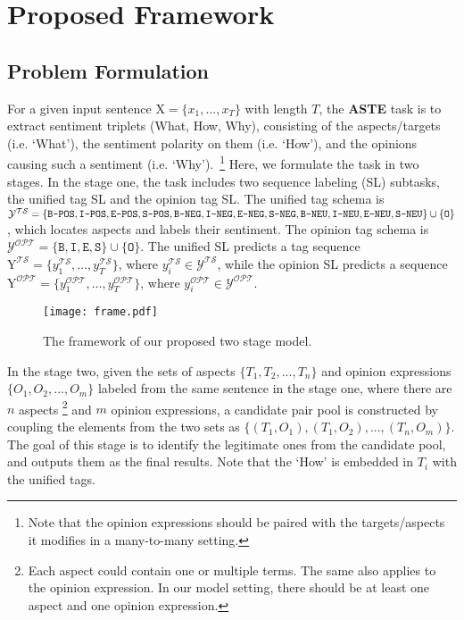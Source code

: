 \documentclass[letterpaper]{article} \usepackage{aaai20}  \usepackage{times}  \usepackage{helvet} \usepackage{courier}  \usepackage[hyphens]{url}  \usepackage{graphicx} \urlstyle{rm} \def\UrlFont{\rm}  \usepackage{graphicx}  \frenchspacing  \setlength{\pdfpagewidth}{8.5in}  \setlength{\pdfpageheight}{11in}
\begin{document}
\section{Proposed Framework}\label{sec:proposedframwork}



\subsection{Problem Formulation}
For a given input sentence $\mathrm{X}=\{x_1,\dots,x_T\}$ with length $T$, the \textbf{ASTE} task is to extract sentiment triplets (What, How, Why), consisting of the aspects/targets (i.e. `What'), the sentiment polarity on them (i.e. `How'), and the opinions causing such a sentiment (i.e. `Why').~\footnote{Note that the opinion expressions should be paired with the targets/aspects it modifies in a many-to-many setting.}
Here, we formulate the task in two stages.
In the stage one, the task includes two sequence labeling (SL) subtasks, the unified tag SL and the opinion tag SL. The unified tag schema is $\mathcal{Y}^{\mathcal{TS}} = \{\texttt{B-POS}, 
\texttt{I-POS},\texttt{E-POS},\texttt{S-POS}, \texttt{B-NEG}, \texttt{I-NEG},\\ \texttt{E-NEG}, \texttt{S-NEG}, \texttt{B-NEU},\texttt{I-NEU},\texttt{E-NEU}, \texttt{S-NEU} \} \cup \{\texttt{O}\}$, which locates aspects and labels their sentiment.
The opinion tag schema is $\mathcal{Y}^{\mathcal{OPT}} = \{\texttt{B},\texttt{I},\texttt{E},\texttt{S} \} \cup \{\texttt{O}\}$. The unified SL predicts a tag sequence $\mathrm{ Y}^{\mathcal{TS}}=\{y^{\mathcal{TS}}_1,\dots,y^{\mathcal{TS}}_T\}$, where $y^{\mathcal{TS}}_i \in \mathcal{Y}^{\mathcal{TS}}$, while the opinion SL predicts a sequence $\mathrm{ Y}^{\mathcal{OPT}}=\{y^{\mathcal{OPT}}_1,\dots,y^{\mathcal{OPT}}_T\}$, where $y^{\mathcal{OPT}}_i \in \mathcal{Y}^{\mathcal{OPT}}$.

    \begin{figure}[!t]
        \centering
        \texttt{[image: frame.pdf]}
        \caption{The framework of our proposed two stage model.}
        \label{fig:framework}
    \end{figure}


In the stage two, given the sets of aspects $\{T_1, T_2 ,..., T_n\}$ and opinion expressions $\{O_1, O_2 ,..., O_m\}$ labeled from the same sentence in the stage one, where there are $n$ aspects \footnote{Each aspect could contain one or multiple terms. The same also applies to the opinion expression. In our model setting, there should be at least one aspect and one opinion expression.} and $m$ opinion expressions, a candidate pair pool is constructed by coupling the elements from the two sets as $\{(T_1,O_1), (T_1,O_2), ... , (T_n,O_m)\}$. The goal of this stage is to identify the legitimate ones from the candidate pool, and outputs them as the final results. Note that the `How' is embedded in $T_i$ with the unified tags.
\end{document}
